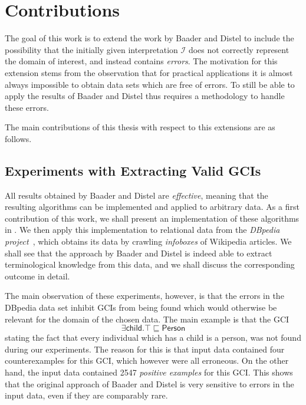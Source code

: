 \section{Contributions}
\label{sec:contributions}

The goal of this work is to extend the work by Baader and Distel to include the
possibility that the initially given interpretation $\mathcal{I}$ does not correctly
represent the domain of interest, and instead contains \emph{errors}.  The motivation for
this extension stems from the observation that for practical applications it is almost
always impossible to obtain data sets which are free of errors.  To still be able to apply
the results of Baader and Distel thus requires a methodology to handle these errors.

The main contributions of this thesis with respect to this extensions are as follows.

\subsection{Experiments with Extracting Valid GCIs}
\label{sec:exper-with-extr}

All results obtained by Baader and Distel are \emph{effective}, meaning that the resulting
algorithms can be implemented and applied to arbitrary data.  As a first contribution of
this work, we shall present an implementation of these algorithms in
.  We then apply this implementation to relational data
from the \emph{DBpedia project}~\cite{DBpedia}, which obtains its data by crawling
\emph{infoboxes} of Wikipedia articles.  We shall see that the approach by Baader and
Distel is indeed able to extract terminological knowledge from this data, and we shall
discuss the corresponding outcome in detail.

The main observation of these experiments, however, is that the errors in the DBpedia data
set inhibit GCIs from being found which would otherwise be relevant for the domain of the
chosen data.  The main example is that the GCI
\begin{equation*}
  \exists \mathsf{child}. \top \sqsubseteq \mathsf{Person}
\end{equation*}
stating the fact that every individual which has a child is a person, was not found during
our experiments.  The reason for this is that input data contained four counterexamples
for this GCI, which however were all erroneous.  On the other hand, the input data
contained 2547 \emph{positive examples} for this GCI.  This shows that the original
approach of Baader and Distel is very sensitive to errors in the input data, even if they
are comparably rare.

